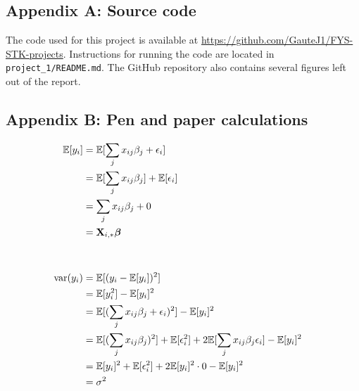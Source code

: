 \subsection{Appendix A: Source code} \label{appendixA}
The code used for this project is available at \url{https://github.com/GauteJ1/FYS-STK-projects}. Instructions for running the code are located in \texttt{ project\_1/README.md}. The GitHub repository also contains several figures left out of the report. 


\subsection{Appendix B: Pen and paper calculations}\label{appendixB}
\begin{align*}
    \mathbb{E}[y_i] & = \mathbb{E}[\sum_j x_{ij}\beta_j + \epsilon_i] \\
    & = \mathbb{E}[\sum_j x_{ij}\beta_j] + \mathbb{E}[\epsilon_i] \\ 
    & = \sum_j x_{ij}\beta_j + 0 \\
    & = \mathbf{X}_{i,*}\boldsymbol{\beta}
    & \\
    & \\
    & \\
    \text{var}(y_i) & = \mathbb{E}[(y_i -\mathbb{E}[y_i])^2] \\
    & = \mathbb{E}[y_i^2] - \mathbb{E}[y_i]^2 \\ 
    & = \mathbb{E}[(\sum_j x_{ij}\beta_j + \epsilon_i)^2] - \mathbb{E}[y_i]^2 \\
    & = \mathbb{E}[(\sum_j x_{ij}\beta_j)^2] + \mathbb{E}[\epsilon_i^2] + 2\mathbb{E}[\sum_j x_{ij}\beta_j \epsilon_i ] - \mathbb{E}[y_i]^2 \\
    & = \mathbb{E}[y_i]^2 + \mathbb{E}[\epsilon_i^2] + 2\mathbb{E}[y_i]^2\cdot 0 - \mathbb{E}[y_i]^2 \\ 
    & = \sigma^2
\end{align*}

